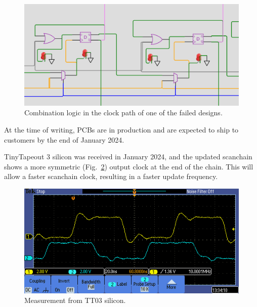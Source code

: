 \begin{figure}[htp]
\centering
\includegraphics[width=\columnwidth]{./Figs/wokwi mux clock logic.png}
\caption{Combination logic in the clock path of one of the failed designs.}
\label{fig:failed_design_comb_logic}
\end{figure}

At the time of writing, PCBs are in production and are expected to ship to customers by the end of January 2024.

TinyTapeout 3 silicon was received in January 2024, and the updated scanchain shows a more symmetric (Fig.~\ref{fig:TT03_silicon_measurement}) output clock at the end of the chain. This will allow a faster scanchain clock, resulting in a faster update frequency.

\begin{figure}[htp]
\centering
\includegraphics[width=\columnwidth]{./Figs/tt03_clock_out.png}
\caption{Measurement from TT03 silicon.}
\label{fig:TT03_silicon_measurement}
\end{figure}

